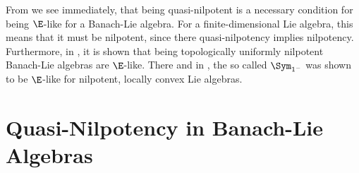 \documentclass[
11pt,                          %
english                        %
]{article}
\begin{document}
From \cite{woj} we see immediately, that being quasi-nilpotent is a necessary 
condition for being $\E$-like for a Banach-Lie algebra. For a finite-dimensional 
Lie algebra, this means that it must be nilpotent, since there quasi-nilpotency 
implies nilpotency. Furthermore, in \cite{stapor:2015a}, it is shown that being 
topologically uniformly nilpotent Banach-Lie algebras are $\E$-like. There and in 
\cite{esposito.stapor.waldmann:2015a:pre}, the so called $\Sym_{1^-}$ was shown to 
be $\E$-like for nilpotent, locally convex Lie algebras.




\section{Quasi-Nilpotency in Banach-Lie Algebras}
\label{sec:QuasiNilpotency}
\end{document}
